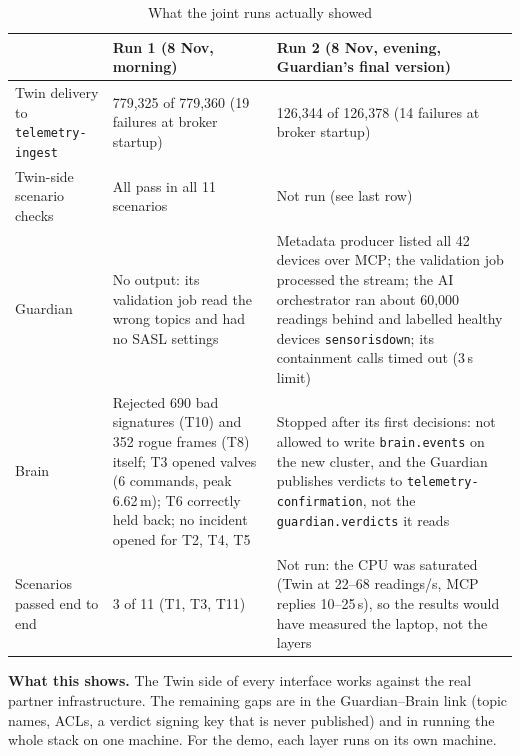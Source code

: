 \documentclass[10pt,a4paper]{article}
\renewcommand{\_}{\textunderscore\allowbreak}
\begin{document}
\begin{table}[H]
\centering
\scriptsize
\renewcommand{\arraystretch}{0.95}
\caption{What the joint runs actually showed}
\label{tab:observed}
\begin{tabularx}{\textwidth}{L{2.6cm}YY}
\toprule
 & \textbf{Run 1 (8 Nov, morning)} & \textbf{Run 2 (8 Nov, evening, Guardian's final version)} \\
\midrule
Twin delivery to \texttt{telemetry-ingest} & 779{,}325 of 779{,}360 (19 failures at broker startup) & 126{,}344 of 126{,}378 (14 failures at broker startup) \\
Twin-side scenario checks & All pass in all 11 scenarios & Not run (see last row) \\
Guardian & No output: its validation job read the wrong topics and had no SASL settings & Metadata producer listed all 42 devices over MCP; the validation job processed the stream; the AI orchestrator ran about 60{,}000 readings behind and labelled healthy devices \texttt{sensor\_is\_down}; its containment calls timed out (3\,s limit) \\
Brain & Rejected 690 bad signatures (T10) and 352 rogue frames (T8) itself; T3 opened valves (6 commands, peak 6.62\,m); T6 correctly held back; no incident opened for T2, T4, T5 & Stopped after its first decisions: not allowed to write \texttt{brain.events} on the new cluster, and the Guardian publishes verdicts to \texttt{telemetry-confirmation}, not the \texttt{guardian.verdicts} it reads \\
Scenarios passed end to end & 3 of 11 (T1, T3, T11) & Not run: the CPU was saturated (Twin at 22--68 readings/s, MCP replies 10--25\,s), so the results would have measured the laptop, not the layers \\
\bottomrule
\end{tabularx}
\end{table}

\textbf{What this shows.} The Twin side of every interface works against the real partner infrastructure. The remaining gaps are in the Guardian--Brain link (topic names, ACLs, a verdict signing key that is never published) and in running the whole stack on one machine. For the demo, each layer runs on its own machine.
\end{document}
